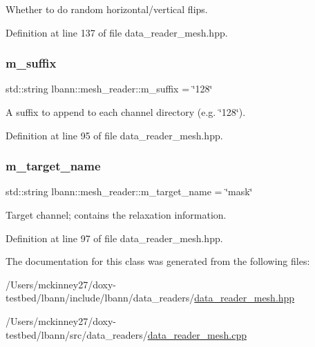 Whether to do random horizontal/vertical flips. 



Definition at line 137 of file data\+\_\+reader\+\_\+mesh.\+hpp.

\mbox{\label{classlbann_1_1mesh__reader_aefadeb4ee1b9202dcadb4625da21c451}} 
\subsubsection{\texorpdfstring{m\+\_\+suffix}{m\_suffix}}
{\footnotesize\ttfamily std\+::string lbann\+::mesh\+\_\+reader\+::m\+\_\+suffix = \char`\"{}128\char`\"{}\hspace{0.3cm}{\ttfamily [protected]}}



A suffix to append to each channel directory (e.\+g. \char`\"{}128\char`\"{}). 



Definition at line 95 of file data\+\_\+reader\+\_\+mesh.\+hpp.

\mbox{\label{classlbann_1_1mesh__reader_a838ab7976ce9e3d85e727159a7d4720c}} 
\subsubsection{\texorpdfstring{m\+\_\+target\+\_\+name}{m\_target\_name}}
{\footnotesize\ttfamily std\+::string lbann\+::mesh\+\_\+reader\+::m\+\_\+target\+\_\+name = \char`\"{}mask\char`\"{}\hspace{0.3cm}{\ttfamily [protected]}}



Target channel; contains the relaxation information. 



Definition at line 97 of file data\+\_\+reader\+\_\+mesh.\+hpp.



The documentation for this class was generated from the following files\+:\begin{DoxyCompactItemize}
\item 
/\+Users/mckinney27/doxy-\/testbed/lbann/include/lbann/data\+\_\+readers/\hyperlink{data__reader__mesh_8hpp}{data\+\_\+reader\+\_\+mesh.\+hpp}\item 
/\+Users/mckinney27/doxy-\/testbed/lbann/src/data\+\_\+readers/\hyperlink{data__reader__mesh_8cpp}{data\+\_\+reader\+\_\+mesh.\+cpp}\end{DoxyCompactItemize}

